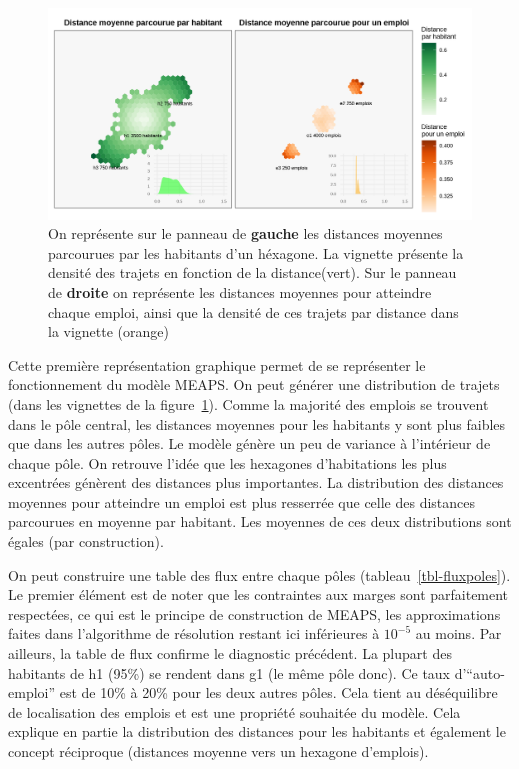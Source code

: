 \documentclass[
  10pt,
  a4paper,
  numbers=noendperiod,
  DIV=9]{scrreprt}
\begin{document}
\begin{figure}[htb]

{\centering \includegraphics[width=1\textwidth,height=\textheight]{./output/gdistances.png}

}

\caption[Distances moyenne par habitant et pour un
emploi]{\label{fig-distances}On représente sur le panneau de
\textbf{gauche} les distances moyennes parcourues par les habitants d'un
héxagone. La vignette présente la densité des trajets en fonction de la
distance(vert). Sur le panneau de \textbf{droite} on représente les
distances moyennes pour atteindre chaque emploi, ainsi que la densité de
ces trajets par distance dans la vignette (orange)}

\end{figure}

Cette première représentation graphique permet de se représenter le
fonctionnement du modèle MEAPS. On peut générer une distribution de
trajets (dans les vignettes de la figure~\ref{fig-distances}). Comme la
majorité des emplois se trouvent dans le pôle central, les distances
moyennes pour les habitants y sont plus faibles que dans les autres
pôles. Le modèle génère un peu de variance à l'intérieur de chaque pôle.
On retrouve l'idée que les hexagones d'habitations les plus excentrées
génèrent des distances plus importantes. La distribution des distances
moyennes pour atteindre un emploi est plus resserrée que celle des
distances parcourues en moyenne par habitant. Les moyennes de ces deux
distributions sont égales (par construction).

On peut construire une table des flux entre chaque pôles
(tableau~\ref{tbl-fluxpoles}). Le premier élément est de noter que les
contraintes aux marges sont parfaitement respectées, ce qui est le
principe de construction de MEAPS, les approximations faites dans
l'algorithme de résolution restant ici inférieures à \(10^{-5}\) au
moins. Par ailleurs, la table de flux confirme le diagnostic précédent.
La plupart des habitants de h1 (95\%) se rendent dans g1 (le même pôle
donc). Ce taux d'``auto-emploi'' est de 10\% à 20\% pour les deux autres
pôles. Cela tient au déséquilibre de localisation des emplois et est une
propriété souhaitée du modèle. Cela explique en partie la distribution
des distances pour les habitants et également le concept réciproque
(distances moyenne vers un hexagone d'emplois).
\end{document}
